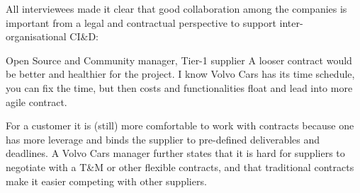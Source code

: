 All interviewees made it clear that good collaboration among the companies is important from a legal and contractual perspective to support inter-organisational CI\&D:

\begin{aquote}{Open Source and Community manager, Tier-1 supplier}
A looser contract would be better and healthier for the project. I know Volvo Cars has its time schedule, you can fix the time, but then costs and functionalities float and lead into more agile contract.
\end{aquote}



 For a customer it is (still) more comfortable to work with contracts because one has more leverage and binds the supplier to pre-defined deliverables and deadlines. A Volvo Cars manager %
further states that it is hard for suppliers to negotiate with a T\&M or other flexible contracts, and that traditional contracts make it easier competing with other suppliers.



